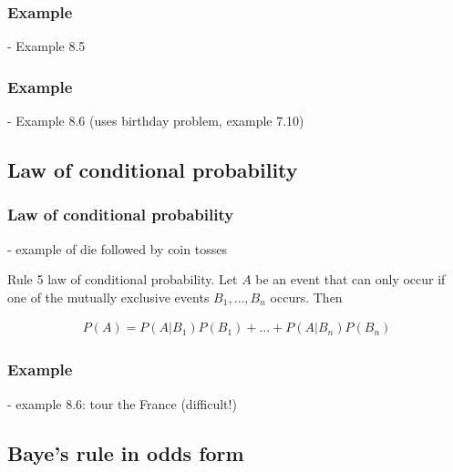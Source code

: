 \begin{frame}
    \frametitle{Example}

- Example 8.5

\end{frame}

\begin{frame}
    \frametitle{Example}

- Example 8.6 (uses birthday problem, example 7.10)

\end{frame}

\subsection{Law of conditional probability}

\begin{frame}
    \frametitle{Law of conditional probability}

- example of die followed by coin tosses

    \begin{description}

        \item{Rule 5} law of conditional probability. Let $A$ be an event that
            can only occur if one of the mutually exclusive events
            $B_1,\ldots,B_n$ occurs. Then

            \begin{align*}
                P(A) = P(A|B_1) P(B_1) + \ldots + P(A|B_n) P(B_n)  
            \end{align*}

    \end{description}

\end{frame}

\begin{frame}
    \frametitle{Example}

- example 8.6: tour the France (difficult!)

\end{frame}

\subsection{Baye's rule in odds form}

